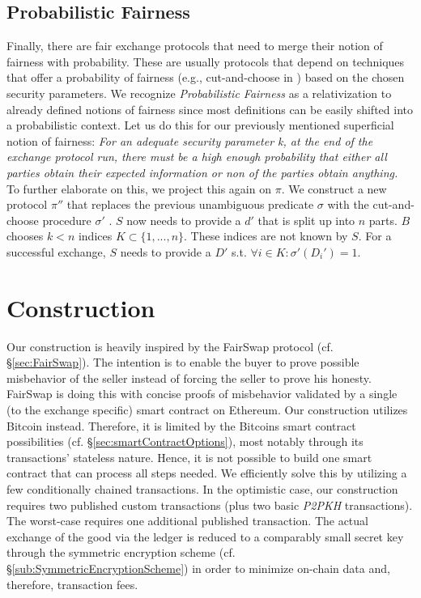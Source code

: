\documentclass{cacthesis}
\newcounter{protocol}
\begin{document}
        \section{Probabilistic Fairness}
        \label{sec:ProbabilisticFairness}
        Finally, there are fair exchange protocols that need to merge their notion of fairness with probability. These are usually protocols that depend on techniques that offer a probability of fairness (e.g., cut-and-choose in \cite{DELGADOSEGURA2020832}) based on the chosen security parameters. We recognize \textit{Probabilistic Fairness} as a relativization to already defined notions of fairness since most definitions can be easily shifted into a probabilistic context. Let us do this for our previously mentioned superficial notion of fairness: \textit{For an adequate security parameter k, at the end of the exchange protocol run, there must be a high enough probability that either all parties obtain their expected information or non of the parties obtain anything.} \\
        To further elaborate on this, we project this again on $\pi$. We construct a new protocol $\pi''$ that replaces the previous unambiguous predicate $\sigma$ with the cut-and-choose procedure $\sigma'$ . $S$ now needs to provide a $d'$ that is split up into $n$ parts. $B$ chooses $k < n$ indices $K \subset \{1, ..., n\}$. These indices are not known by $S$. For a successful exchange, $S$ needs to provide a $D'$ s.t. $\forall i\in K:\sigma'\left( D_{i}'\right) =1$. \\

		
	\chapter{Construction}
	   \label{ch:Construction}
	   Our construction is heavily inspired by the FairSwap protocol (cf. §\ref{sec:FairSwap}). The intention is to enable the buyer to prove possible misbehavior of the seller instead of forcing the seller to prove his honesty. FairSwap is doing this with concise proofs of misbehavior validated by a single (to the exchange specific) smart contract on Ethereum. Our construction utilizes Bitcoin instead. Therefore, it is limited by the Bitcoins smart contract possibilities (cf. §\ref{sec:smartContractOptions}), most notably through its transactions' stateless nature. Hence, it is not possible to build one smart contract that can process all steps needed. We efficiently solve this by utilizing a few conditionally chained transactions. In the optimistic case, our construction requires two published custom transactions (plus two basic \textit{P2PKH} transactions). The worst-case requires one additional published transaction. The actual exchange of the good via the ledger is reduced to a comparably small secret key through the symmetric encryption scheme (cf. §\ref{sub:SymmetricEncryptionScheme}) in order to minimize on-chain data and, therefore, transaction fees.
	   
\end{document}
